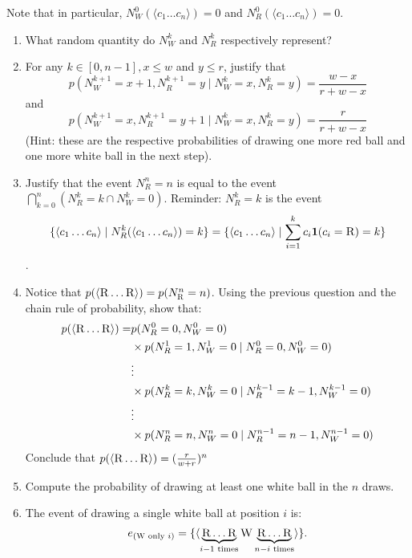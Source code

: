 \documentclass{article}
\begin{document}
Note that in particular, $N^0_W(\langle c_1 \dots c_n \rangle) = 0$ and $N^0_R(\langle c_1 \dots c_n \rangle) = 0$.
\begin{enumerate}
\item What random quantity do $N^k_W$ and $N^k_R$ respectively represent? 
\item For any $k \in [0, n-1], x \le w$ and $y \le r$, justify that
  \[p(N^{k+1}_W  = x+1, N^{k+1}_R = y \mid N^{k}_W = x, N^{k}_R = y) = \frac{w - x}{r +w - x} \] and
  \[ p(N^{k+1}_W  = x, N^{k+1}_R = y+1 \mid N^{k}_W = x, N^{k}_R = y) = \frac{r}{r +w - x} \]
  (Hint: these are the respective probabilities of drawing one more red ball and one more white ball in the next step).
\item Justify that the event $N^{n}_R = n$ is equal to the event $\bigcap^{n}_{k=0} (N^{k}_R = k \cap N^{k}_W = 0)$. Reminder: $N^{k}_R = k$ is the event \[\{ \langle c_1 \dots c_n \rangle \mid N^k_R(\langle c_1 \dots c_n \rangle) = k \} = \{ \langle c_1 \dots c_n \rangle \mid \sum^k_{i = 1} c_i \mathbf{1}(c_i = \textsc{R}) = k \} \].
\item Notice that $p(\langle \textsc{R} \dots \textsc{R} \rangle ) = p(N^n_\textsc{R} = n)$. Using the previous question and the chain rule of probability, show that:
  \[\begin{aligned}p(\langle \textsc{R} \dots \textsc{R} \rangle) = &p(N^0_R = 0, N^0_W = 0)\\& \times p(N^1_R = 1, N^1_W = 0 \mid  N^0_R = 0, N^0_W = 0)\\ & \vdots  \\&\times p(N^{k}_R = k, N^{k}_W = 0 \mid N^{k-1}_R = k-1, N^{k-1}_W = 0)\\& \vdots \\&\times p(N^{n}_R = n, N^{n}_W = 0 \mid N^{n-1}_R = n-1, N^{n-1}_W = 0) \end{aligned}\]
  Conclude that $p(\langle \textsc{R} \dots \textsc{R} \rangle) = (\frac{r}{w+r})^{n}$
\item Compute the probability of drawing at least one white ball in the $n$ draws.
\item The event of drawing a single white ball at position $i$ is:
  \[e_{(\textsc{W} \textnormal{ only } i)} = \{ \langle \underbrace{\textsc{R} \dots \textsc{R}}_{i-1 \textnormal{ times}} \textsc{W} \underbrace{\textsc{R} \dots \textsc{R}}_{n-i \textnormal{ times}} \rangle  \}.\]


\end{enumerate}
\end{document}
